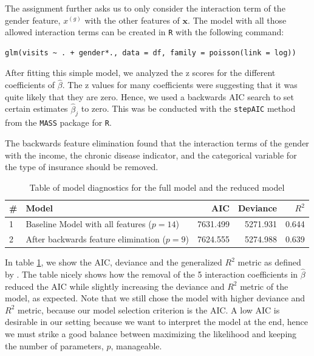 \documentclass[a4paper,11pt]{article}
\begin{document}
The assignment further asks us to only consider the interaction term of the gender feature, $x^{(g)}$ with the other features of $\mathbf{x}$. The model with all those allowed interaction terms can be created in \texttt{R} with the following command:

\begin{verbatim}
glm(visits ~ . + gender*., data = df, family = poisson(link = log))
\end{verbatim}

After fitting this simple model, we analyzed the z scores for the different coefficients of $\hat{\beta}$. The z values for many coefficients were suggesting that it was quite likely that they are zero. Hence, we used a backwards AIC search to set certain estimates $\hat{\beta}_j$ to zero.  This was be conducted with the \texttt{stepAIC} method from the \texttt{MASS} package for \texttt{R}.

The backwards feature elimination found that the interaction terms of the gender with the income, the chronic disease indicator, and the categorical variable for the type of insurance should be removed.

\begin{table}[h]
    \centering
    \begin{tabular}{|l|l|r|r|r|}
    \hline
 \# &Model & AIC & Deviance & $R^2$\\
    \hline
1&    Baseline Model with all features ($p=14$) &  7631.499 & 5271.931 & 0.644\\
2&    After backwards feature elimination ($p=9$) & 7624.555 & 5274.988  & 0.639\\
        \hline
        
    \end{tabular}
    \caption{Table of model diagnostics for the full model and the reduced model}
    \label{tab:backwards_elimination}
\end{table}
In table \ref{tab:backwards_elimination}, we show the AIC, deviance and the generalized $R^2$ metric as defined by \cite{cameron}. The table nicely shows how the removal of the 5 interaction coefficients in $\hat{\beta}$ reduced the AIC while slightly increasing the deviance and $R^2$ metric of the model, as expected. Note that we still chose the model with higher deviance and $R^2$ metric, because our model selection criterion is the AIC. A low AIC is desirable in our setting because we want to interpret the model at the end, hence we must strike a good balance between maximizing the likelihood and keeping the number of parameters, $p$, manageable.
\end{document}
